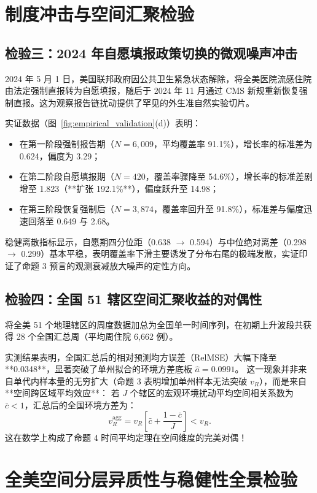 \section{制度冲击与空间汇聚检验}\label{sec:policy_spatial}

\subsection{检验三：2024 年自愿填报政策切换的微观噪声冲击}
2024 年 5 月 1 日，美国联邦政府因公共卫生紧急状态解除，将全美医院流感住院由法定强制直报转为自愿填报，随后于 2024 年 11 月通过 CMS 新规重新恢复强制直报。这为观察报告链扰动提供了罕见的外生准自然实验切片。

实证数据（图~\ref{fig:empirical_validation}(d)）表明：
\begin{itemize}
    \item 在第一阶段强制报告期（$N = 6{,}009$，平均覆盖率 91.1\%），增长率的标准差为 0.624，偏度为 3.29；
    \item 在第二阶段自愿填报期（$N = 420$，覆盖率骤降至 54.6\%），增长率的标准差剧增至 1.823（**扩张 192.1\%**），偏度跃升至 14.98；
    \item 在第三阶段恢复强制后（$N = 3{,}874$，覆盖率回升至 91.8\%），标准差与偏度迅速回落至 0.649 与 2.68。
\end{itemize}
稳健离散指标显示，自愿期四分位距（0.638 $\to$ 0.594）与中位绝对离差（0.298 $\to$ 0.299）基本平稳，表明覆盖率下滑主要诱发了分布右尾的极端发散，实证印证了命题 3 预言的观测衰减放大噪声的定性方向。

\subsection{检验四：全国 51 辖区空间汇聚收益的对偶性}
将全美 51 个地理辖区的周度数据加总为全国单一时间序列，在初期上升波段共获得 28 个全国汇总周（平均周住院 6,662 例）。

实测结果表明，全国汇总后的相对预测均方误差（RelMSE）大幅下降至 **0.0348**，显著突破了单州拟合的环境方差底板 $\hat{a} = 0.0991$。
这一现象并非来自单代内样本量的无穷扩大（命题 3 表明增加单州样本无法突破 $v_R$），而是来自**空间跨区域平均效应**：
若 $J$ 个辖区的宏观环境扰动平均空间相关系数为 $\bar{c} < 1$，汇总后的全国环境方差为：
\begin{equation}
v_R^{\text{agg}} = v_R \left[ \bar{c} + \frac{1 - \bar{c}}{J} \right] < v_R.
\end{equation}
这在数学上构成了命题 4 时间平均定理在空间维度的完美对偶！


\section{全美空间分层异质性与稳健性全景检验}\label{sec:spatial_heterogeneity}

